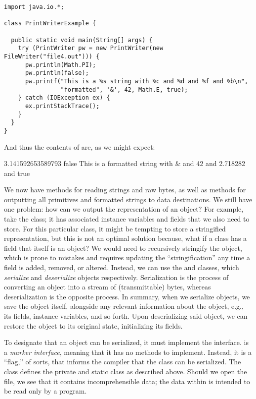 
\begin{lstlisting}[language=MyJava]
import java.io.*;

class PrintWriterExample {
  
  public static void main(String[] args) {
    try (PrintWriter pw = new PrintWriter(new FileWriter("file4.out"))) {
      pw.println(Math.PI);
      pw.println(false);
      pw.printf("This is a %s string with %c and %d and %f and %b\n", 
                "formatted", '&', 42, Math.E, true);
    } catch (IOException ex) { 
      ex.printStackTrace(); 
    }
  }
}
\end{lstlisting}

And thus the contents of  are, as we might expect:

\begin{verbnobox}[\small]
3.141592653589793
false
This is a formatted string with & and 42 and 2.718282 and true
\end{verbnobox}

We now have methods for reading strings and raw bytes, as well as methods for outputting all primitives and formatted strings to data destinations.
We still have one problem: how can we output the representation of an object? For example, take the  class; it has associated instance variables and fields that we also need to store. 
For this particular class, it might be tempting to store a stringified representation, but this is not an optimal solution because, what if a class has a field that itself is an object? 
We would need to recursively stringify the object, which is prone to mistakes and requires updating the ``stringification'' any time a field is added, removed, or altered. 
Instead, we can use the  and  classes, which \emph{serialize} and \emph{deserialize} objects respectively. 
Serialization is the process of converting an object into a stream of (transmittable) bytes, whereas deserialization is the opposite process. 
In summary, when we serialize objects, we save the object itself, alongside any relevant information about the object, e.g., its fields, instance variables, and so forth. 
Upon deserializing said object, we can restore the object to its original state, initializing its fields.

To designate that an object can be serialized, it must implement the  interface. 
 is a \emph{marker interface}, meaning that it has no methods to implement. 
Instead, it is a ``flag,'' of sorts, that informs the compiler that the class can be serialized. 
The  class defines the private and static  class as described above. 
Should we open the  file, we see that it contains incomprehensible data; the data within is intended to be read only by a program.

